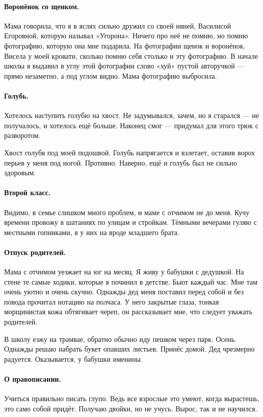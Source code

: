 \documentclass{book}
\begin{document}
\paragraph{Воронёнок со щенком.}
Мама говорила, что я в яслях сильно дружил со своей няней, Василисой Егоровной,
которую называл «Угорона».
Ничего про неё не помню, но помню фотографию, которую она мне подарила.
На фотографии щенок и воронёнок.
Висела у моей кровати, сколько помню себя столько и эту фотографию.
В начале школы я выдавил в углу этой фотографии слово «хуй» пустой авторучкой --- прямо незаметно, а под углом видно.
Мама фотографию выбросила.

\paragraph{Голубь.}
Хотелось наступить голубю на хвост.
Не задумывался, зачем, но я старался — не получалось, и хотелось ещё больше.
Наконец смог — придумал для этого трюк с разворотом.

Хвост голубя под моей подошвой.
Голубь напрягается и взлетает, оставив ворох перьев у меня под ногой.
Противно.
Наверно, ещё и голубь был не сильно здоровым.

\paragraph{Второй класс.} 
Видимо, в семье слишком много проблем, и маме с отчимом не до меня.
Кучу времени провожу в шатаниях по улицам и стройкам.
Тёмными вечерами гуляю с местными гопниками, 
я у них на вроде младшего брата.

\paragraph{Отпуск родителей.} 
Мама с отчимом уезжает на юг на месяц.
Я живу у бабушки с дедушкой.
На стене те самые ходики, которые я починил в детстве.
Бьют каждый час.
Мне там очень уютно и очень скучно.
Однажды дед меня поставил перед собой и без повода прочитал нотацию на полчаса.
У него закрытые глаза,
тонкая морщинистая кожа обтягивает череп, 
он рассказывает мне, что следует уважать родителей.

В школу езжу на трамвае, обратно обычно иду пешком через парк.
Осень.
Однажды решаю набрать букет опавших листьев.
Принёс домой. 
Дед чрезмерно радуется. 
Оказывается, у бабушки именины.

\paragraph{О правописании.}
Учиться правильно писать глупо. 
Ведь все взрослые это умеют,
когда вырастешь, это само собой придёт.
Получаю двойки, но не учусь. 
Вырос, так и не научился.
\end{document}
